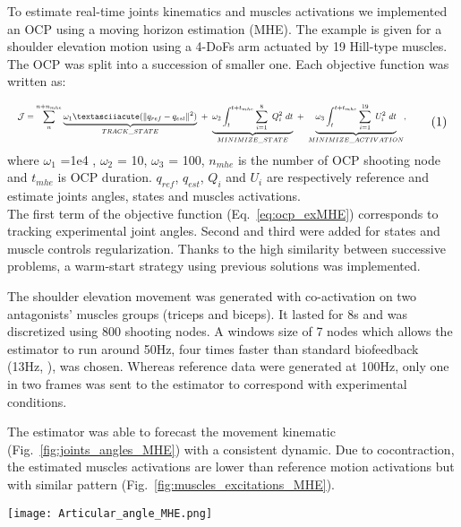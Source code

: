To estimate real-time joints kinematics and muscles activations we implemented an OCP using a moving horizon estimation (MHE).
The example is given for a shoulder elevation motion using a 4-DoFs arm actuated by 19 Hill-type muscles.
The OCP was split into a succession of smaller one. Each objective function was written as:
   
\[
\resizebox{0.9\columnwidth}{!}{$
\begin{aligned} 
\mathcal{J} = \sum_{n}^{n + n_{mhe}}\underbrace{\omega_1´(\|q_{ref} - q_{est}\|^{2})}_{TRACK\_STATE} ~ 
+ ~ \underbrace{\omega_2\int_t^{t+t_{mhe}} \sum_{i=1}^{8}~Q_{i}^2~dt}_{MINIMIZE\_ STATE} ~ 
+ ~ \underbrace{\omega_3\int_t^{t+t_{mhe}} \sum_{i=1}^{19}~U_{i}^2~dt}_{MINIMIZE\_ ACTIVATION},
\end{aligned} 
$} 
\addtag 
\label{eq:ocp_exMHE} 
\] 
\noindent where $\omega_1$ =1e4 , $\omega_2$ = 10, $\omega_3$ = 100, $n_{mhe}$ is the number of OCP shooting node and $t_{mhe}$ is OCP duration. $q_{ref}$, $q_{est}$, $Q_i$ and $U_i$ are respectively reference and estimate joints angles, states and muscles activations. \\
  
The first term of the objective function (Eq.~\ref{eq:ocp_exMHE}) corresponds to tracking experimental joint angles.
Second and third were added for states and muscle controls regularization.
Thanks to the high similarity between successive problems, a warm-start strategy using previous solutions was implemented.  
 
 
The shoulder elevation movement was generated with co-activation on two antagonists' muscles groups (triceps and biceps).
It lasted for 8s and was discretized using 800 shooting nodes.
A windows size of 7 nodes which allows the estimator to run around 50Hz, four times faster than standard biofeedback (13Hz, \cite{kannape2013biofeedback}), was chosen.
Whereas reference data were generated at 100Hz, only one in two frames was sent to the estimator to correspond with experimental conditions.
 
The estimator was able to forecast the movement kinematic (Fig.~\ref{fig:joints_angles_MHE}) with a consistent dynamic.
Due to cocontraction, the estimated muscles activations are lower than reference motion activations but with similar pattern (Fig.~\ref{fig:muscles_excitations_MHE}). 


\begin{figure*}[t!]
\centering
\texttt{[image: Articular\_angle\_MHE.png]}\\
\caption{Time histories of estimate joints angles (blue cross) and reference joints angles (orange line).}
\label{fig:joints_angles_MHE}
\end{figure*}

